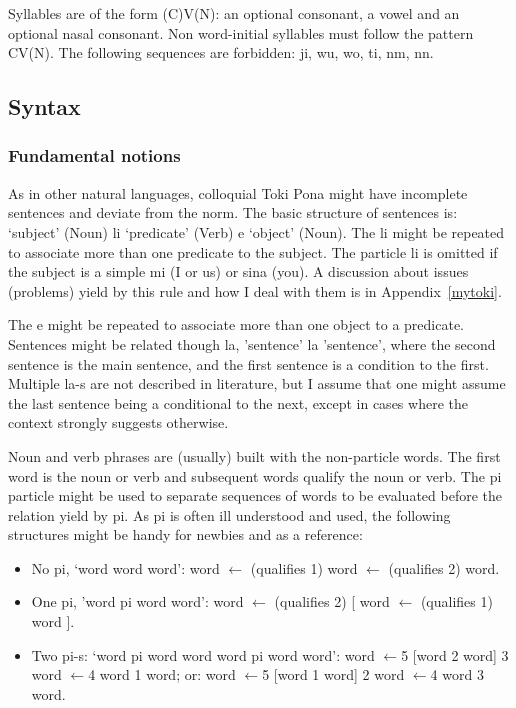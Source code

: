 \documentclass{article}
\begin{document}
Syllables are of the form (C)V(N):
an optional consonant, a vowel and an optional nasal consonant.
Non word-initial syllables must follow the pattern CV(N).
The following sequences are forbidden: ji, wu, wo, ti, nm, nn.

\subsection{Syntax}\label{syntax}
\subsubsection{Fundamental notions}
As in other natural languages, 
colloquial Toki Pona might have
incomplete sentences and deviate from the
norm.
The basic structure of sentences is:
`subject' (Noun) li `predicate' (Verb) e `object' (Noun).
The li might be repeated to associate more than
one predicate to the subject.
The particle li is omitted if the subject is a simple mi (I or us)
or sina (you). A discussion about issues (problems)
yield by this rule
and how I deal with them is in Appendix~\ref{mytoki}.

The e might be repeated to associate more than
one object to a predicate.
Sentences might be related though la,
'sentence' la 'sentence', where the second sentence is
the main sentence, and the first sentence is a condition
to the first.
Multiple la-s are not described in literature,
but I assume that one might assume the last sentence
being a conditional to the next,
except in cases where the context strongly suggests
otherwise.

Noun and verb phrases are (usually) built with the non-particle words.
The first word is the noun or verb and subsequent words
qualify the noun or verb.
The pi particle might be used to separate sequences of words
to be evaluated before the relation yield by pi.
As pi is often ill understood and used,
the following structures might be handy for newbies and as a
reference:
\begin{itemize}
  \item No pi, `word word word':
word $\leftarrow$ (qualifies 1) word $\leftarrow$ (qualifies 2)  word.
  \item One pi, 'word pi word word': word $\leftarrow$ (qualifies 2) [
      word $\leftarrow$ (qualifies 1)  word ].
  \item Two pi-s: `word pi word word word pi word word':
    word $\leftarrow$5 [word 2 word] 3 word $\leftarrow$4 word 1  word;
or:
    word $\leftarrow$5 [word 1 word] 2 word $\leftarrow$4 word 3  word.
\end{itemize}
\end{document}
